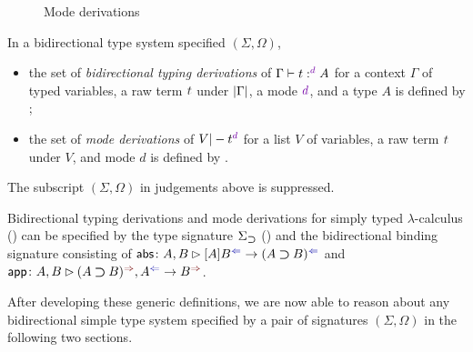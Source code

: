 \begin{definition}
\begin{figure}
    \caption{Mode derivations}
    \label{fig:mode-derivations}
  \end{figure}
  In a bidirectional type system specified $(\Sigma, \Omega)$,
  \begin{itemize}
    \item the set of \emph{bidirectional typing derivations} of $\Gamma \vdash t :^\dir{d} A$ for a context $\Gamma$ of typed variables, a raw term $\isTerm{t}$ under $\left|\Gamma\right|$, a mode $\dir{d}$, and a type $A$ is defined by ;
    \item the set of \emph{mode derivations} of $V |- t^\dir{d}$ for a list $V$ of variables, a raw term $\isTerm{t}$ under $V$, and mode $d$ is defined by .
  \end{itemize}
  The subscript $(\Sigma, \Omega)$ in judgements above is suppressed.
\end{definition}

\begin{example}
  Bidirectional typing derivations and mode derivations for simply typed $\lambda$-calculus () can be specified by the type signature $\Sigma_{\mathbin{\bm{\supset}}}$ () and the bidirectional binding signature consisting of $\mathsf{abs}\colon A , B \rhd [A]B^{\chk} \to (A \bto B)^{\chk}$ and $\mathsf{app}\colon A, B \rhd (A \bto B)^{\syn}, A^{\chk} \to B^{\syn}$.
\end{example}

After developing these generic definitions, we are now able to reason about any bidirectional simple type system specified by a pair of signatures $(\Sigma, \Omega)$ in the following two sections.
